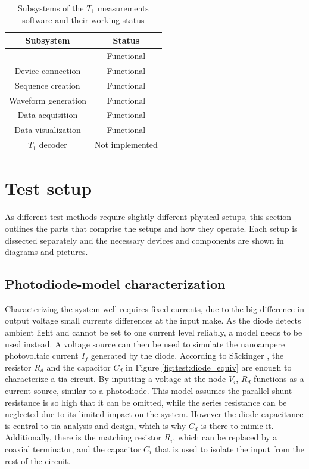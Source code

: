 \begin{table}[ht]
	\centering
		\begin{tabular}{|c|c|}
			\hline
			Subsystem         	& Status 			\\ \hline
			\glsfmtshort{gui} 	& Functional 		\\ \hline
			Device connection 	& Functional 		\\ \hline
			Sequence creation	& Functional 		\\ \hline
			Waveform generation	& Functional 		\\ \hline
			Data acquisition	& Functional 		\\ \hline
			Data visualization	& Functional 		\\ \hline
			$T_1$ decoder		& Not implemented 	\\ \hline
		\end{tabular}
	\caption{Subsystems of the $T_1$ measurements software and their working status}
	\label{tab:test:metrics}
\end{table}



\section{Test setup}
As different test methods require slightly different physical setups, this section outlines the parts that comprise the setups and how they operate. Each setup is dissected separately and the necessary devices and components are shown in diagrams and pictures.

\subsection{Photodiode-model characterization}
Characterizing the system well requires fixed currents, due to the big difference in output voltage small currents differences at the input make. As the diode detects ambient light and cannot be set to one current level reliably, a model needs to be used instead. A voltage source can then be used to simulate the nanoampere photovoltaic current $I_f$ generated by the diode. According to Säckinger \cite{sackinger2017analysis}, the resistor $R_d$ and the capacitor $C_d$ in Figure \ref{fig:test:diode_equiv} are enough to characterize a \gls{tia} circuit. By inputting a voltage at the node $V_i$, $R_d$ functions as a current source, similar to a photodiode. This model assumes the parallel shunt resistance is so high that it can be omitted, while the series resistance can be neglected due to its limited impact on the system. However the diode capacitance is central to \gls{tia} analysis and design, which is why $C_d$ is there to mimic it. Additionally, there is the matching resistor $R_i$, which can be replaced by a coaxial terminator, and the capacitor $C_i$ that is used to isolate the input from the rest of the circuit.

